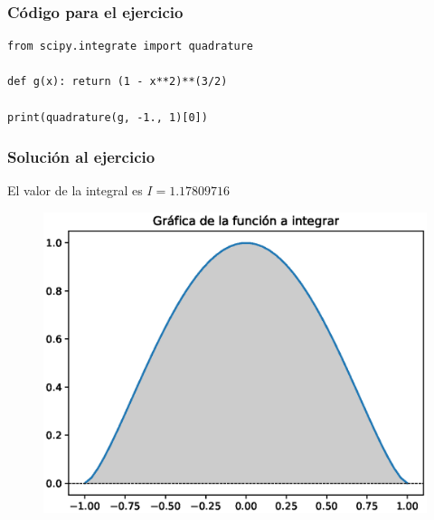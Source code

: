 \documentclass[12pt]{beamer}
\begin{document}
\begin{frame}[fragile]
\frametitle{Código para el ejercicio}
\begin{lstlisting}[caption=Código para cuadratura Gaussiana]
from scipy.integrate import quadrature

def g(x): return (1 - x**2)**(3/2)

print(quadrature(g, -1., 1)[0])
\end{lstlisting}
\end{frame}
\begin{frame}
\frametitle{Solución al ejercicio}
El valor de la integral es $I = 1.17809716$
\begin{figure}
  \centering
  \includegraphics[scale=0.5]{Imagenes/cuadratura_01.eps}
\end{figure}
\end{frame}
\end{document}
